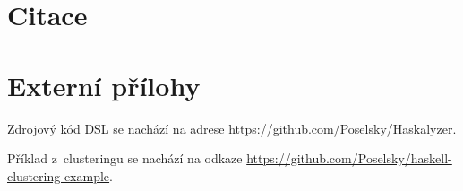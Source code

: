\documentclass[male, czech]{kithesis}
\begin{document}
\chapter{Citace}


\printbibliography[heading=none]
\appendix


\chapter{Externí přílohy}

Zdrojový kód DSL se nachází na adrese \href{https://github.com/Poselsky/Haskalyzer}{https://github.com/Poselsky/Haskalyzer}.

Příklad z~clusteringu se nachází na odkaze \href{https://github.com/Poselsky/haskell-clustering-example}{https://github.com/Poselsky/haskell-clustering-example}.
\end{document}
